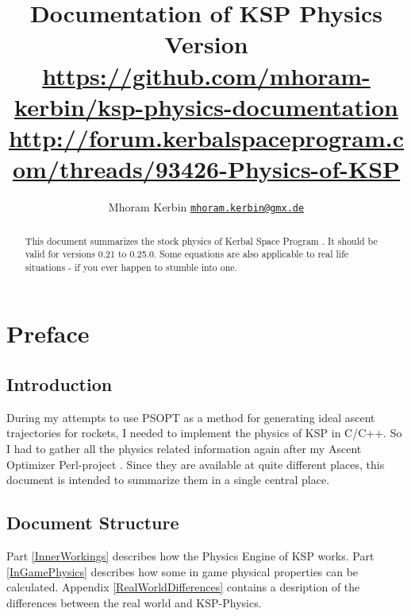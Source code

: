 \documentclass[11pt]{report}
\begin{document}
\title{Documentation of KSP Physics\\\small{Version }\\\vspace{1 em}\url{https://github.com/mhoram-kerbin/ksp-physics-documentation}\\\url{http://forum.kerbalspaceprogram.com/threads/93426-Physics-of-KSP}}
\author {Mhoram Kerbin \href{mailto:mhoram.kerbin@gmx.de}{\nolinkurl{mhoram.kerbin@gmx.de}}}

\maketitle

\begin{abstract}

  This document summarizes the stock physics of Kerbal Space Program
  \cite{KSP}. It should be valid for versions 0.21 to 0.25.0. Some
  equations are also applicable to real life situations - if you ever
  happen to stumble into one.

\end{abstract}

\tableofcontents

\chapter{Preface}

\section{Introduction}

During my attempts to use PSOPT as a method for generating ideal
ascent trajectories for rockets, I needed to implement the physics of
KSP in C/C++. So I had to gather all the physics related information
again after my Ascent Optimizer Perl-project \cite{PAO}. Since they
are available at quite different places, this document is intended to
summarize them in a single central place.

\section{Document Structure}

Part \ref{InnerWorkings} describes how the Physics Engine of KSP
works. Part \ref{InGamePhysics} describes how some in game physical
properties can be calculated. Appendix \ref{RealWorldDifferences}
contains a desription of the differences between the real world and
KSP-Physics.
\end{document}
